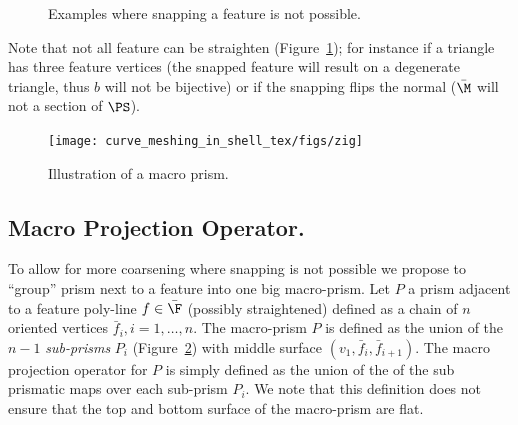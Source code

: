 \begin{figure}
    \centering
    \caption{Examples where snapping a feature is not possible.}
    \label{bichon:fig:snapping-fail}
\end{figure}

Note that not all feature can be straighten (Figure~\ref{bichon:fig:snapping-fail}); for instance if a triangle has three feature vertices (the snapped feature will result on a degenerate triangle, thus $b$ will not be bijective) or if the snapping flips the normal ($\bar\M$ will not a section of $\PS$).


\begin{figure}
    \centering
    \texttt{[image: curve\_meshing\_in\_shell\_tex/figs/zig]}
    \caption{Illustration of a macro prism.}
    \label{bichon:fig:zig}
\end{figure}
\subsection{Macro Projection Operator.}\label{sec:macro}
To allow for more coarsening where snapping is not possible we propose to ``group'' prism next to a feature into one big macro-prism.
Let $P$ a prism adjacent to a feature poly-line $f\in\bar\F$ (possibly straightened) defined as a chain of $n$ oriented vertices $\bar f_i, i=1,\dots,n$. The macro-prism $P$ is defined as the union of the $n-1$ \emph{sub-prisms} $P_i$ (Figure~\ref{bichon:fig:zig}) with middle surface $(v_1, \bar f_i, \bar f_{i+1})$. The macro projection operator for $P$ is simply defined as the union of the of the sub prismatic maps over each sub-prism $P_i$. We note that this definition does not ensure that the top and bottom surface of the macro-prism are flat.


